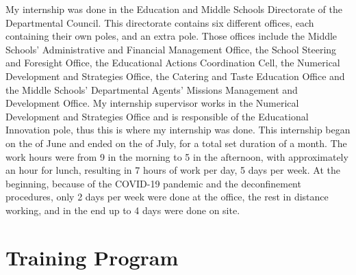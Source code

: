 \documentclass[12pt]{article}
\begin{document}
My internship was done in the Education and Middle Schools Directorate of the Departmental Council. This directorate contains six different offices, each containing their own poles, and an extra pole. Those offices include the Middle Schools' Administrative and Financial Management Office, the School Steering and Foresight Office, the Educational Actions Coordination Cell, the Numerical Development and Strategies Office, the Catering and Taste Education Office and the Middle Schools' Departmental Agents' Missions Management and Development Office. My internship supervisor works in the Numerical Development and Strategies Office and is responsible of the Educational Innovation pole, thus this is where my internship was done. This internship began on the  of June and ended on the  of July, for a total set duration of a month. The work hours were from 9 in the morning to 5 in the afternoon, with approximately an hour for lunch, resulting in 7 hours of work per day, 5 days per week. At the beginning, because of the COVID-19 pandemic and the deconfinement procedures, only 2 days per week were done at the office, the rest in distance working, and in the end up to 4 days were done on site. 

\section{Training Program}
\end{document}
